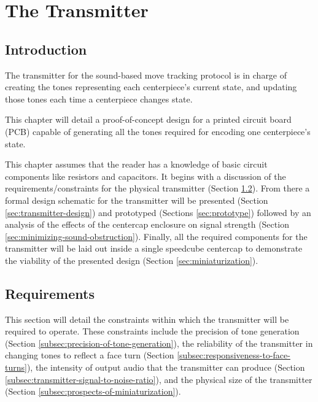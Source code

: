 
\chapter{The Transmitter} %
\label{Chapter6} 


\section{Introduction}

The transmitter for the sound-based move tracking protocol is in charge
of creating the tones representing each centerpiece's current state,
and updating those tones each time a centerpiece changes state.

This chapter will detail a proof-of-concept design for a printed
circuit board (PCB) capable of generating all the tones required for
encoding one centerpiece's state.

This chapter assumes that the reader has a knowledge of basic circuit
components like resistors and capacitors. It begins with a discussion
of the requirements/constraints for the physical transmitter (Section
\ref{sec:transmitter-requirements}). From there a formal design
schematic for the transmitter will be presented (Section
\ref{sec:transmitter-design}) and prototyped (Sections
\ref{sec:prototype}) followed by an analysis of the effects of the
centercap enclosure on signal strength (Section
\ref{sec:minimizing-sound-obstruction}). Finally, all the required
components for the transmitter will be laid out inside a single
speedcube centercap to demonstrate the viability of the presented
design (Section \ref{sec:miniaturization}).


\section{Requirements}
\label{sec:transmitter-requirements}

This section will detail the constraints within which the transmitter
will be required to operate. These constraints include the precision of
tone generation (Section \ref{subsec:precision-of-tone-generation}),
the reliability of the transmitter in changing tones to reflect a face
turn (Section \ref{subsec:responsiveness-to-face-turns}), the intensity
of output audio that the transmitter can produce (Section
\ref{subsec:transmitter-signal-to-noise-ratio}), and the physical size
of the transmitter (Section \ref{subsec:prospects-of-miniaturization}).

